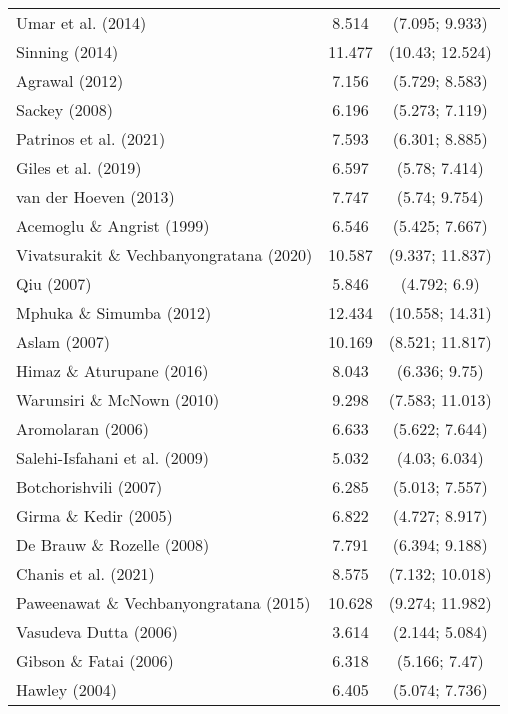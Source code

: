 \begin{singlespace}
\begin{footnotesize}
\begin{longtable}{
@{\hskip\tabcolsep}
l
*{2}{c}
@{}}
                      Umar et al. (2014) &  8.514 &   (7.095; 9.933) \\
                          Sinning (2014) & 11.477 &  (10.43; 12.524) \\
                          Agrawal (2012) &  7.156 &   (5.729; 8.583) \\
                           Sackey (2008) &  6.196 &   (5.273; 7.119) \\
                  Patrinos et al. (2021) &  7.593 &   (6.301; 8.885) \\
                     Giles et al. (2019) &  6.597 &    (5.78; 7.414) \\
                   van der Hoeven (2013) &  7.747 &    (5.74; 9.754) \\
              Acemoglu \& Angrist (1999) &  6.546 &   (5.425; 7.667) \\
Vivatsurakit \& Vechbanyongratana (2020) & 10.587 &  (9.337; 11.837) \\
                              Qiu (2007) &  5.846 &     (4.792; 6.9) \\
                Mphuka \& Simumba (2012) & 12.434 &  (10.558; 14.31) \\
                            Aslam (2007) & 10.169 &  (8.521; 11.817) \\
               Himaz \& Aturupane (2016) &  8.043 &    (6.336; 9.75) \\
              Warunsiri \& McNown (2010) &  9.298 &  (7.583; 11.013) \\
                       Aromolaran (2006) &  6.633 &   (5.622; 7.644) \\
           Salehi-Isfahani et al. (2009) &  5.032 &    (4.03; 6.034) \\
                   Botchorishvili (2007) &  6.285 &   (5.013; 7.557) \\
                   Girma \& Kedir (2005) &  6.822 &   (4.727; 8.917) \\
              De Brauw \& Rozelle (2008) &  7.791 &   (6.394; 9.188) \\
                    Chanis et al. (2021) &  8.575 &  (7.132; 10.018) \\
  Paweenawat \& Vechbanyongratana (2015) & 10.628 &  (9.274; 11.982) \\
                   Vasudeva Dutta (2006) &  3.614 &   (2.144; 5.084) \\
                  Gibson \& Fatai (2006) &  6.318 &    (5.166; 7.47) \\
                           Hawley (2004) &  6.405 &   (5.074; 7.736) \\

\end{longtable}
\end{footnotesize}
\end{singlespace}
